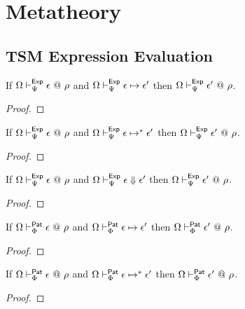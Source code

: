 \section{Metatheory}\label{appendix:metatheory-P}
\subsection{TSM Expression Evaluation}
\begin{theorem}
\label{thm:peTSM-preservation}
If $\Omega \vdash_{\Psi}^{\mathsf{Exp}} \epsilon ~@~ \rho$ and $\Omega \vdash_{\Psi}^\mathsf{Exp} \epsilon \mapsto \epsilon'$ then $\Omega \vdash_{\Psi}^{\mathsf{Exp}} \epsilon' ~@~ \rho$.
\end{theorem}
\begin{proof}\end{proof}

\begin{theorem}
\label{thm:peTSM-preservation-multistep}
If $\Omega \vdash_{\Psi}^{\mathsf{Exp}} \epsilon ~@~ \rho$ and $\Omega \vdash_{\Psi}^\mathsf{Exp} \epsilon \mapsto^{*} \epsilon'$ then $\Omega \vdash_{\Psi}^{\mathsf{Exp}} \epsilon' ~@~ \rho$.
\end{theorem}
\begin{proof}\end{proof}

\begin{theorem}
\label{thm:peTSM-preservation-evaluation}
If $\Omega \vdash_{\Psi}^{\mathsf{Exp}} \epsilon ~@~ \rho$ and $\Omega \vdash_{\Psi}^\mathsf{Exp} \epsilon \Downarrow \epsilon'$ then $\Omega \vdash_{\Psi}^{\mathsf{Exp}} \epsilon' ~@~ \rho$.
\end{theorem}
\begin{proof}\end{proof}

\begin{theorem}
\label{thm:ppTSM-preservation}
If $\Omega \vdash_{\Phi}^{\mathsf{Pat}} \epsilon ~@~ \rho$ and $\Omega \vdash_{\Phi}^\mathsf{Pat} \epsilon \mapsto \epsilon'$ then $\Omega \vdash_{\Phi}^{\mathsf{Pat}} \epsilon' ~@~ \rho$.
\end{theorem}
\begin{proof}\end{proof}

\begin{theorem}
\label{thm:ppTSM-preservation-multistep}
If $\Omega \vdash_{\Phi}^{\mathsf{Pat}} \epsilon ~@~ \rho$ and $\Omega \vdash_{\Phi}^\mathsf{Pat} \epsilon \mapsto^{*} \epsilon'$ then $\Omega \vdash_{\Phi}^{\mathsf{Pat}} \epsilon' ~@~ \rho$.
\end{theorem}
\begin{proof}\end{proof}

